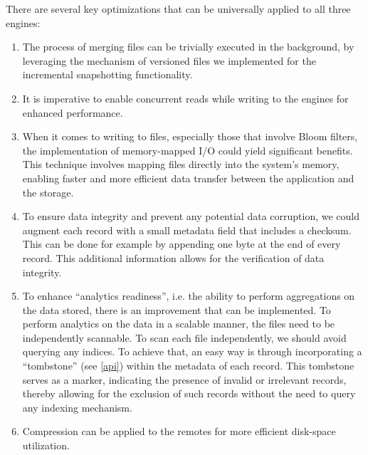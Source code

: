 There are several key optimizations that can be universally applied to all three engines:

\begin{enumerate}
    \item The process of merging files can be trivially executed in the background, by leveraging the mechanism of versioned files we implemented for the incremental snapshotting functionality.

    \item It is imperative to enable concurrent reads while writing to the engines for enhanced performance.

    \item When it comes to writing to files, especially those that involve Bloom filters, the implementation of memory-mapped I/O could yield significant benefits. This technique involves mapping files directly into the system's memory, enabling faster and more efficient data transfer between the application and the storage.

    \item To ensure data integrity and prevent any potential data corruption, we could augment each record with a small metadata field that includes a checksum. This can be done for example by appending one byte at the end of every record. This additional information allows for the verification of data integrity.

    \item To enhance ``analytics readiness'', i.e. the ability to perform aggregations on the data stored, there is an improvement that can be implemented. To perform analytics on the data in a scalable manner, the files need to be independently scannable. To scan each file independently, we should avoid querying any indices. To achieve that, an easy way is through incorporating a ``tombstone'' (see \ref{api}) within the metadata of each record. This tombstone serves as a marker, indicating the presence of invalid or irrelevant records, thereby allowing for the exclusion of such records without the need to query any indexing mechanism.

    \item Compression can be applied to the remotes for more efficient disk-space utilization.
\end{enumerate}
